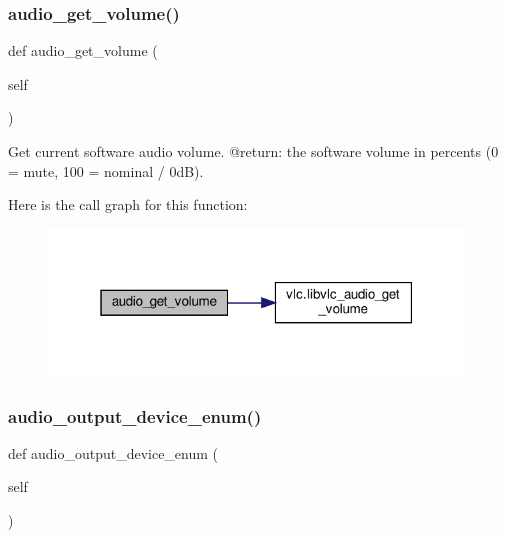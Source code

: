 \subsubsection{\texorpdfstring{audio\+\_\+get\+\_\+volume()}{audio\_get\_volume()}}
{\footnotesize\ttfamily def audio\+\_\+get\+\_\+volume (\begin{DoxyParamCaption}\item[{}]{self }\end{DoxyParamCaption})}

\begin{DoxyVerb}Get current software audio volume.
@return: the software volume in percents (0 = mute, 100 = nominal / 0dB).
\end{DoxyVerb}
 Here is the call graph for this function\+:
\nopagebreak
\begin{figure}[H]
\begin{center}
\leavevmode
\includegraphics[width=313pt]{classvlc_1_1_media_player_a445a9aa9f2b954c73c4ef24348d2e86b_cgraph}
\end{center}
\end{figure}
\mbox{\label{classvlc_1_1_media_player_a8f936fa19d272b0c7bcf4916a0ddf095}} 
\subsubsection{\texorpdfstring{audio\+\_\+output\+\_\+device\+\_\+enum()}{audio\_output\_device\_enum()}}
{\footnotesize\ttfamily def audio\+\_\+output\+\_\+device\+\_\+enum (\begin{DoxyParamCaption}\item[{}]{self }\end{DoxyParamCaption})}

